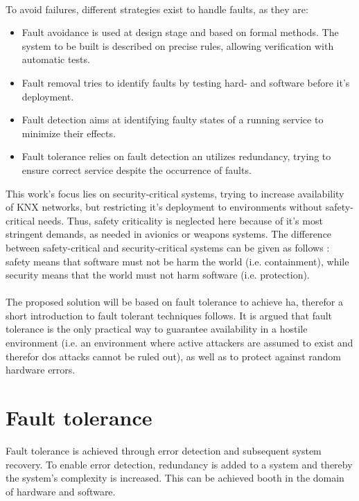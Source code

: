 \\
To avoid failures, different strategies exist to handle faults, as they are:
\begin{itemize}
 \item Fault avoidance is used at design stage and based on formal methods. The system to be built is described on precise rules, allowing verification with 
 automatic tests.
 \item Fault removal tries to identify faults by testing hard- and software before it's deployment.
 \item Fault detection aims at identifying faulty states of a running service to minimize their effects.
 \item Fault tolerance relies on fault detection an utilizes redundancy, trying to ensure correct service despite the occurrence of faults. 
\end{itemize}
This work's focus lies on security-critical systems, trying to increase availability of KNX networks, but restricting it's
deployment to environments without safety-critical needs. Thus, safety criticality is neglected here because of it's most stringent demands, as needed in
avionics or weapons systems.
The difference between safety-critical and security-critical systems can be given as follows \cite{5784222}: safety means that software must not be harm the 
world (i.e. containment), while security means that the world must not harm software (i.e. protection). 
\\
\\
The proposed solution will be based on fault tolerance to achieve \gls{ha}, therefor a short introduction to fault tolerant techniques follows.
It is argued that fault tolerance is the only practical way to guarantee availability
in a hostile environment (i.e. an environment where active attackers are assumed to exist and therefor \gls{dos} attacks cannot be ruled out), as well as to
protect against random hardware errors.

\section{Fault tolerance}
Fault tolerance is achieved through error detection and subsequent system recovery. To enable error detection, redundancy is added to a system and thereby the 
system's complexity is increased. This can be achieved booth in the domain of hardware
and software.

